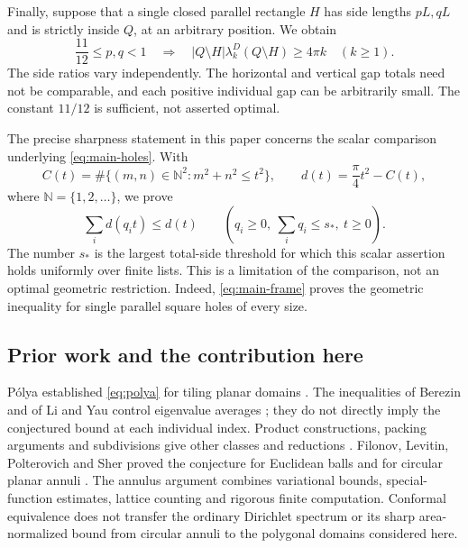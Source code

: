 \documentclass[11pt,reqno]{amsart}
\numberwithin{equation}{section}
\newcommand{\N}{\mathbb N}
\begin{document}
Finally, suppose that a single closed parallel rectangle $H$ has
side lengths $pL,qL$ and is strictly inside $Q$, at an arbitrary
position. We obtain
\begin{equation}\label{eq:main-displaced}
 \frac{11}{12}\le p,q<1
 \quad\Longrightarrow\quad
 |Q\setminus H|\lambda_k^D(Q\setminus H)\ge4\pi k
 \quad(k\ge1).
\end{equation}
The side ratios vary independently. The horizontal and vertical
gap totals need not be comparable, and each positive individual
gap can be arbitrarily small. The constant $11/12$ is sufficient,
not asserted optimal.

The precise sharpness statement in this paper concerns the scalar
comparison underlying \eqref{eq:main-holes}. With
\begin{equation}\label{eq:count-intro}
 C(t)=\#\{(m,n)\in\N^2:m^2+n^2\le t^2\},
 \qquad d(t)=\frac\pi4t^2-C(t),
\end{equation}
where $\N=\{1,2,\ldots\}$, we prove
\begin{equation}\label{eq:scalar-main}
 \sum_i d(q_it)\le d(t)
 \qquad\left(q_i\ge0,\ \sum_iq_i\le s_*,\ t\ge0\right).
\end{equation}
The number $s_*$ is the largest total-side threshold for which
this scalar assertion holds uniformly over finite lists.
This is a limitation of the comparison, not an optimal geometric
restriction. Indeed, \eqref{eq:main-frame} proves the geometric
inequality for single parallel square holes of every size.

\subsection*{Prior work and the contribution here}

P\'olya established \eqref{eq:polya} for tiling planar domains
\cite{Polya1961}. The inequalities of Berezin and of Li and Yau
control eigenvalue averages \cite{Berezin1972,LiYau1983}; they do
not directly imply the conjectured bound at each individual index.
Product constructions, packing arguments and subdivisions give
other classes and reductions
\cite{Laptev1997,FLP2021,FS2023,HW2026}. Filonov, Levitin,
Polterovich and Sher proved the conjecture for Euclidean balls
\cite{FLPS2023} and for circular planar annuli \cite{FLPS2026}.
The annulus argument combines variational bounds, special-function
estimates, lattice counting and rigorous finite computation.
Conformal equivalence does not transfer the ordinary Dirichlet
spectrum or its sharp area-normalized bound from circular annuli
to the polygonal domains considered here.
\end{document}
